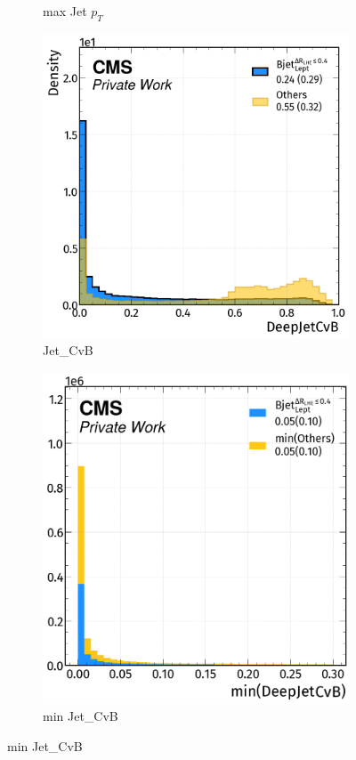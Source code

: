 \begin{figure}[H]
\begin{subfigure}{0.4306\linewidth}
        \caption{max Jet $p_T$}
    \end{subfigure}  
    \hfill
    \begin{subfigure}{0.47\linewidth}
        \centering
        \includegraphics[width=1\linewidth]{fig//chap08-kin_reco/cvb.png}
        \caption{Jet\_CvB}
    \end{subfigure}
    \hfill
    \begin{subfigure}{0.4306\linewidth}  
        \centering
        \includegraphics[width=1\linewidth]{fig//chap08-kin_reco/min_cvb.png}
        \caption{min Jet\_CvB}
    \end{subfigure}  
\end{figure}






